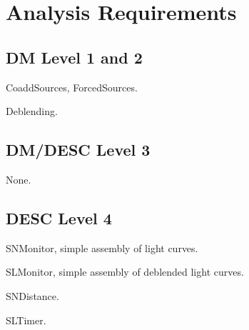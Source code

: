 \section{Analysis Requirements}
\label{sec:twinkles1:analysis}



\subsection{DM Level 1 and 2}

CoaddSources, ForcedSources.

Deblending.


\subsection{DM/DESC Level 3}

None.


\subsection{DESC Level 4}

SNMonitor, simple assembly of light curves.

SLMonitor, simple assembly of deblended light curves.

SNDistance.

SLTimer.

